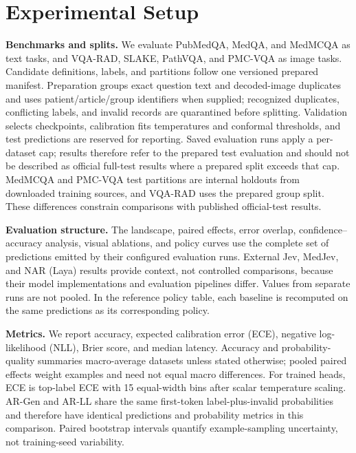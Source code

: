 

\section{Experimental Setup}
\label{sec:setup}

\textbf{Benchmarks and splits.} We evaluate PubMedQA, MedQA, and MedMCQA as text tasks, and VQA-RAD, SLAKE, PathVQA, and PMC-VQA as image tasks. Candidate definitions, labels, and partitions follow one versioned prepared manifest. Preparation groups exact question text and decoded-image duplicates and uses patient/article/group identifiers when supplied; recognized duplicates, conflicting labels, and invalid records are quarantined before splitting. Validation selects checkpoints, calibration fits temperatures and conformal thresholds, and test predictions are reserved for reporting. Saved evaluation runs apply a per-dataset cap; results therefore refer to the prepared test evaluation and should not be described as official full-test results where a prepared split exceeds that cap. MedMCQA and PMC-VQA test partitions are internal holdouts from downloaded training sources, and VQA-RAD uses the prepared group split. These differences constrain comparisons with published official-test results.



\textbf{Evaluation structure.} The landscape, paired effects, error overlap, confidence--accuracy analysis, visual ablations, and policy curves use the complete set of predictions emitted by their configured evaluation runs. External Jev, MedJev, and NAR (Laya) results provide context, not controlled comparisons, because their model implementations and evaluation pipelines differ. Values from separate runs are not pooled. In the reference policy table, each baseline is recomputed on the same predictions as its corresponding policy.

\textbf{Metrics.} We report accuracy, expected calibration error (ECE), negative log-likelihood (NLL), Brier score, and median latency. Accuracy and probability-quality summaries macro-average datasets unless stated otherwise; pooled paired effects weight examples and need not equal macro differences. For trained heads, ECE is top-label ECE with 15 equal-width bins after scalar temperature scaling. AR-Gen and AR-LL share the same first-token label-plus-invalid probabilities and therefore have identical predictions and probability metrics in this comparison. Paired bootstrap intervals quantify example-sampling uncertainty, not training-seed variability.

